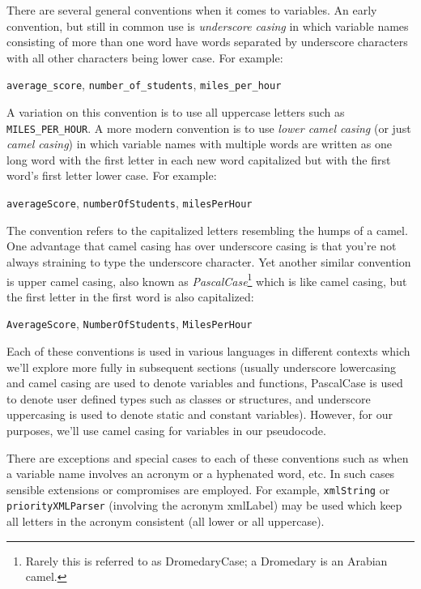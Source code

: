 There are several general conventions when it comes to variables.  An early 
convention, but still in common use is \emph{underscore casing} in which 
variable names consisting of more than one word have words separated by
underscore characters with all other characters being lower case.  For example:
\begin{center}
\texttt{average_score}, \texttt{number_of_students}, \texttt{miles_per_hour}
\end{center}
A variation on this convention is to use all uppercase letters such as \texttt{MILES_PER_HOUR}.
A more modern convention is to use \emph{lower camel casing} (or just \emph{camel casing}) in
which variable names with multiple words are written as one long word with the
first letter in each new word capitalized but with the first word's first letter lower case.
For example:
\begin{center}
\texttt{averageScore}, \texttt{numberOfStudents}, \texttt{milesPerHour}
\end{center}
The convention refers to the capitalized letters resembling the humps of a camel.
One advantage that camel casing has over underscore casing is that you're not always
straining to type the underscore character.  Yet another similar convention is upper camel
casing, also known as \emph{PascalCase}\footnote{Rarely this is referred to as DromedaryCase; 
a Dromedary is an Arabian camel.} which is like camel casing, but the first letter
in the first word is also capitalized:
\begin{center}
\texttt{AverageScore}, \texttt{NumberOfStudents}, \texttt{MilesPerHour}
\end{center}
Each of these conventions is used in various languages in different contexts which
we'll explore more fully in subsequent sections (usually
underscore lowercasing and camel casing are used to denote variables and
functions, PascalCase is used to denote user defined types such as classes or 
structures, and underscore uppercasing is used to denote static and constant variables).  
However, for our purposes, we'll use camel casing for variables in our pseudocode.

There are exceptions and special cases to each of these conventions such
as when a variable name involves an acronym or a hyphenated word, etc.  In such
cases sensible extensions or compromises are employed.  For example, 
\texttt{xmlString} or \texttt{priorityXMLParser} (involving the acronym 
\gls{xmlLabel}) may be used which keep all letters in the acronym consistent (all lower
or all uppercase).

